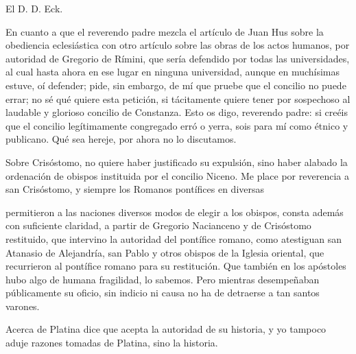 El D. D. Eck.

En cuanto a que el reverendo padre mezcla el artículo de Juan Hus sobre la obediencia eclesiástica con otro artículo sobre las obras de los actos humanos, por autoridad de Gregorio de Rímini, que sería defendido por todas las universidades, al cual hasta ahora en ese lugar en ninguna universidad, aunque en muchísimas estuve, oí defender; pide, sin embargo, de mí que pruebe que el concilio no puede errar; no sé qué quiere esta petición, si tácitamente quiere tener por sospechoso al laudable y glorioso concilio de Constanza. Esto os digo, reverendo padre: si creéis que el concilio legítimamente congregado erró o yerra, sois para mí como étnico y publicano. Qué sea hereje, por ahora no lo discutamos.

Sobre Crisóstomo, no quiere haber justificado su expulsión, sino haber alabado la ordenación de obispos instituida por el concilio Niceno. Me place por reverencia a san Crisóstomo, y siempre los Romanos pontífices en diversas

permitieron a las naciones diversos modos de elegir a los obispos, consta además con suficiente claridad, a partir de Gregorio Nacianceno y de Crisóstomo restituido, que intervino la autoridad del pontífice romano, como atestiguan san Atanasio de Alejandría, san Pablo y otros obispos de la Iglesia oriental, que recurrieron al pontífice romano para su restitución. Que también en los apóstoles hubo algo de humana fragilidad, lo sabemos. Pero mientras desempeñaban públicamente su oficio, sin indicio ni causa no ha de detraerse a tan santos varones.

Acerca de Platina dice que acepta la autoridad de su historia, y yo tampoco aduje razones tomadas de Platina, sino la historia.

